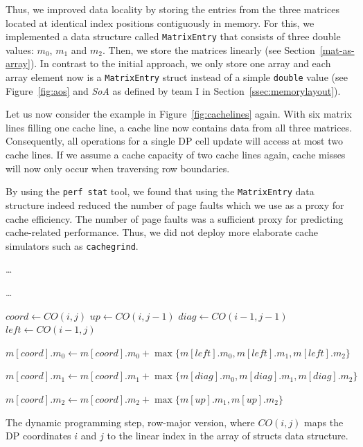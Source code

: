 \documentclass[runningheads,a4paper]{llncs}
\begin{document}
Thus, we improved data locality by storing the entries from the three matrices located at identical index positions contiguously in memory.
For this, we implemented a data structure called \texttt{MatrixEntry} that consists of three double values: \texttt{$m_0$}, \texttt{$m_1$} and \texttt{$m_2$}.
Then, we store the matrices linearly (see Section~\ref{mat-as-array}).
In contrast to the initial approach, we only store one array and each array element now is a \texttt{MatrixEntry} struct instead of a simple
\texttt{double} value (see Figure~\ref{fig:aos} and {\em SoA} as defined by team I in Section~\ref{ssec:memorylayout}). 


Let us now consider the example in Figure~\ref{fig:cachelines} again.
With six matrix lines filling one cache line, a cache line now contains data from all three matrices.
Consequently, all operations for a single DP cell update
will access at most two cache lines.
If we assume a cache capacity of two cache lines again, cache misses will now only occur when traversing row boundaries.

By using the \texttt{perf stat} tool, we found that using the \texttt{MatrixEntry} data structure indeed reduced
the number of page faults which we use as a proxy for cache efficiency. 
The number of page faults was a sufficient proxy for predicting cache-related performance. Thus, we 
did not deploy more elaborate cache simulators such as \verb|cachegrind|.


\begin{algorithm}

\ldots{}
 {
	 {
		\ldots{}

		$coord \gets CO(i, j)$\;
		$up \gets CO(i, j-1)$\;
		$diag \gets CO(i-1, j-1)$\;
		$left \gets CO(i-1, j)$\;

		$m[coord].m_0 \gets m[coord].m_0 + \max\{m[left].m_0, m[left].m_1, m[left].m_2\}$\;

		$m[coord].m_1 \gets m[coord].m_1 + \max\{m[diag].m_0, m[diag].m_1, m[diag].m_2\}$\;

		$m[coord].m_2 \gets m[coord].m_2 + \max\{m[up].m_1, m[up].m_2\}$\;
	}
}

\caption{The dynamic programming step, row-major version, where $CO(i, j)$ maps the DP coordinates $i$ and $j$ to the linear index in the array of structs data structure.}
\label{alg:dp}
\end{algorithm}
\end{document}
